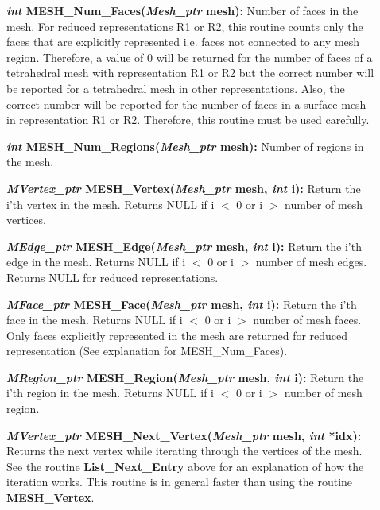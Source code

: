 \documentclass[12pt]{article}
\begin{document}
\begin{description}
\item[]{\bf {\em int} MESH\_Num\_Faces({\em Mesh\_ptr} mesh):}
Number of faces in the mesh. For reduced representations R1 or R2,
this routine counts only the faces that are explicitly represented
i.e. faces not connected to any mesh region. Therefore, a value of 0
will be returned for the number of faces of a tetrahedral mesh with
representation R1 or R2 but the correct number will be reported for a
tetrahedral mesh in other representations. Also, the correct number
will be reported for the number of faces in a surface mesh in
representation R1 or R2.  Therefore, this routine must be used
carefully.


\item[]{\bf {\em int} MESH\_Num\_Regions({\em Mesh\_ptr} mesh):}
Number of regions in the mesh.

\item[]

\item[]{\bf {\em MVertex\_ptr} MESH\_Vertex({\em Mesh\_ptr} mesh,
{\em int} i):} Return the i'th vertex in the mesh. Returns NULL if i
$<$ 0 or i $>$ number of mesh vertices.

\item[]{\bf {\em MEdge\_ptr} MESH\_Edge({\em Mesh\_ptr} mesh,
{\em int} i):} Return the i'th edge in the mesh. Returns NULL if i $<$
0 or i $>$ number of mesh edges. Returns NULL for reduced
representations.

\item[]{\bf {\em MFace\_ptr} MESH\_Face({\em Mesh\_ptr} mesh,
{\em int} i):} Return the i'th face in the mesh. Returns NULL if i $<$
0 or i $>$ number of mesh faces. Only faces explicitly represented in
the mesh are returned for reduced representation (See explanation for
MESH\_Num\_Faces).

\item[]{\bf {\em MRegion\_ptr} MESH\_Region({\em Mesh\_ptr} mesh, {\em
      int} i):} Return the i'th region in the mesh. Returns NULL if i
  $<$ 0 or i $>$ number of mesh region.

\item[]

\item[]{\bf {\em MVertex\_ptr} MESH\_Next\_Vertex({\em Mesh\_ptr}
    mesh, {\em int} *idx):} Returns the next vertex while iterating
  through the vertices of the mesh. See the routine {\bf
    List\_Next\_Entry} above for an explanation of how the iteration
  works. This routine is in general faster than using the routine {\bf
    MESH\_Vertex}.


\end{description}
\end{document}
